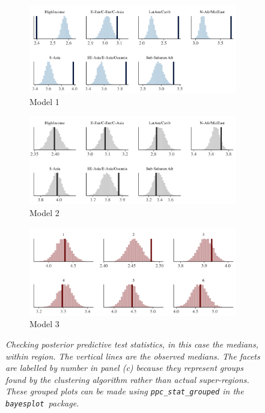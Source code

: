 \documentclass{statsoc}
\newcommand{\bayesplot}{{\tt bayesplot}}
\begin{document}
\begin{figure}
\centering
\begin{subfigure}{\textwidth}
\includegraphics[width=\textwidth]{ppc_med_grouped1.png}
\caption{Model 1}
\label{fig:ppc_med_grouped0}
\end{subfigure}
\begin{subfigure}{\textwidth}
\includegraphics[width=\textwidth]{ppc_med_grouped2.png}
\caption{Model 2}
\label{fig:ppc_med_grouped2}
\end{subfigure}
\begin{subfigure}{\textwidth}
\includegraphics[width=\textwidth]{ppc_med_grouped3.png}
\caption{Model 3}
\label{fig:ppc_med_grouped3}
\end{subfigure}

\caption{\it Checking posterior predictive test statistics, in this case the
medians, within region. The vertical lines are the observed medians. The facets
are labelled by number in panel (c) because they represent groups found by the
clustering algorithm rather than actual super-regions. These grouped plots can
be made using {\tt ppc\_stat\_grouped} in the \bayesplot\ package.}
\label{fig:ppc_med_grouped}
\end{figure}
\end{document}
